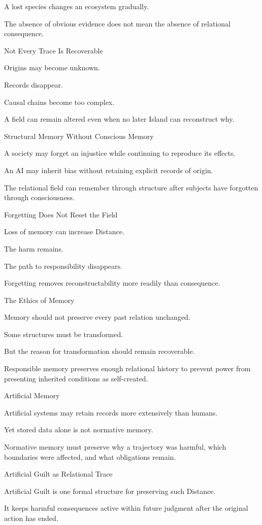 A lost species changes an ecosystem gradually.

The absence of obvious evidence does not mean the absence of relational consequence.

Not Every Trace Is Recoverable

Origins may become unknown.

Records disappear.

Causal chains become too complex.

A field can remain altered even when no later Island can reconstruct why.

Structural Memory Without Conscious Memory

A society may forget an injustice while continuing to reproduce its effects.

An AI may inherit bias without retaining explicit records of origin.

The relational field can remember through structure after subjects have forgotten through consciousness.

Forgetting Does Not Reset the Field

Loss of memory can increase Distance.

The harm remains.

The path to responsibility disappears.

Forgetting removes reconstructability more readily than consequence.

The Ethics of Memory

Memory should not preserve every past relation unchanged.

Some structures must be transformed.

But the reason for transformation should remain recoverable.

Responsible memory preserves enough relational history to prevent power from presenting inherited conditions as self-created.

Artificial Memory

Artificial systems may retain records more extensively than humans.

Yet stored data alone is not normative memory.

Normative memory must preserve why a trajectory was harmful, which boundaries were affected, and what obligations remain.

Artificial Guilt as Relational Trace

Artificial Guilt is one formal structure for preserving such Distance.

It keeps harmful consequences active within future judgment after the original action has ended.

